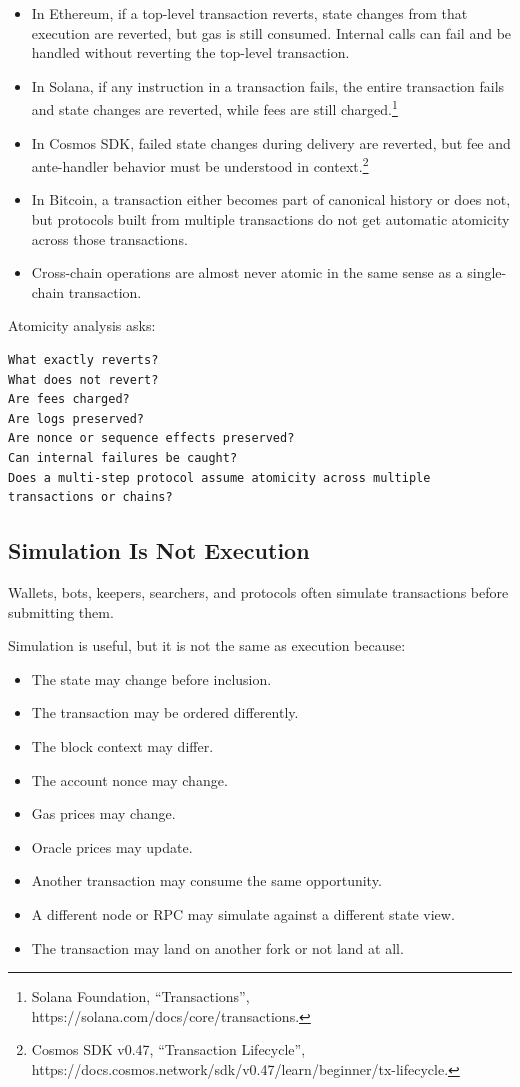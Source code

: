 \begin{itemize}
\tightlist
\item
  In Ethereum, if a top-level transaction reverts, state changes from
  that execution are reverted, but gas is still consumed. Internal calls
  can fail and be handled without reverting the top-level transaction.
\item
  In Solana, if any instruction in a transaction fails, the entire
  transaction fails and state changes are reverted, while fees are still
  charged.\footnote{Solana Foundation, ``Transactions'',
    https://solana.com/docs/core/transactions.}
\item
  In Cosmos SDK, failed state changes during delivery are reverted, but
  fee and ante-handler behavior must be understood in
  context.\footnote{Cosmos SDK v0.47, ``Transaction Lifecycle'',
    https://docs.cosmos.network/sdk/v0.47/learn/beginner/tx-lifecycle.}
\item
  In Bitcoin, a transaction either becomes part of canonical history or
  does not, but protocols built from multiple transactions do not get
  automatic atomicity across those transactions.
\item
  Cross-chain operations are almost never atomic in the same sense as a
  single-chain transaction.
\end{itemize}

Atomicity analysis asks:

\begin{lstlisting}
What exactly reverts?
What does not revert?
Are fees charged?
Are logs preserved?
Are nonce or sequence effects preserved?
Can internal failures be caught?
Does a multi-step protocol assume atomicity across multiple transactions or chains?
\end{lstlisting}

\subsection{Simulation Is Not Execution}

Wallets, bots, keepers, searchers, and protocols often simulate
transactions before submitting them.

Simulation is useful, but it is not the same as execution because:

\begin{itemize}
\tightlist
\item
  The state may change before inclusion.
\item
  The transaction may be ordered differently.
\item
  The block context may differ.
\item
  The account nonce may change.
\item
  Gas prices may change.
\item
  Oracle prices may update.
\item
  Another transaction may consume the same opportunity.
\item
  A different node or RPC may simulate against a different state view.
\item
  The transaction may land on another fork or not land at all.
\end{itemize}

